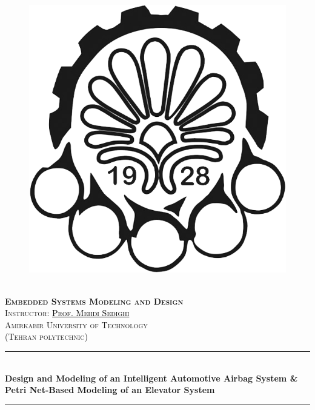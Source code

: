 \documentclass[12pt]{article}
\newcommand{\HRule}{\rule{\linewidth}{0.5mm}} %
\begin{document}
\begin{center}
    \begin{figure}
        \vspace{-1.0cm}
        \centering
        \includegraphics[scale = 0.35]{Images/AUT_logo.png} %
    \end{figure}
    \mbox{}\\[2.0cm]
    \textsc{\Huge \textbf{Embedded Systems Modeling and Design}}\\[1.0cm]
    \textsc{\LARGE Instructor: \href{https://scholar.google.com/citations?user=2RN0Y2YAAAAJ&hl=en}{\textcolor{black}{Prof. Mehdi Sedighi}}}\\[2.5cm]
    \textsc{\LARGE Amirkabir University of Technology} \\%
    \textsc{(Tehran polytechnic)}
    \HRule\\[0.4cm]
    {\large \bf {\selectfont Design and Modeling of an Intelligent Automotive Airbag System \& Petri Net-Based Modeling of an Elevator System} }\\[0.2cm]
    \HRule\\[1.5cm]
\end{center}
\end{document}
